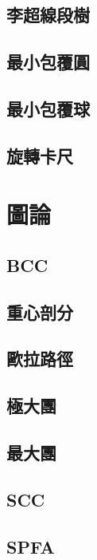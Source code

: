 \documentclass[a4paper,10pt,twocolumn,oneside]{article}
\begin{document}
\subsection{李超線段樹}

\subsection{最小包覆圓}

\subsection{最小包覆球}

\subsection{旋轉卡尺}

\section{圖論}
\subsection{BCC}

\subsection{重心剖分}

\subsection{歐拉路徑}

\subsection{極大團}

\subsection{最大團}

\subsection{SCC}

\subsection{SPFA}

\end{document}
